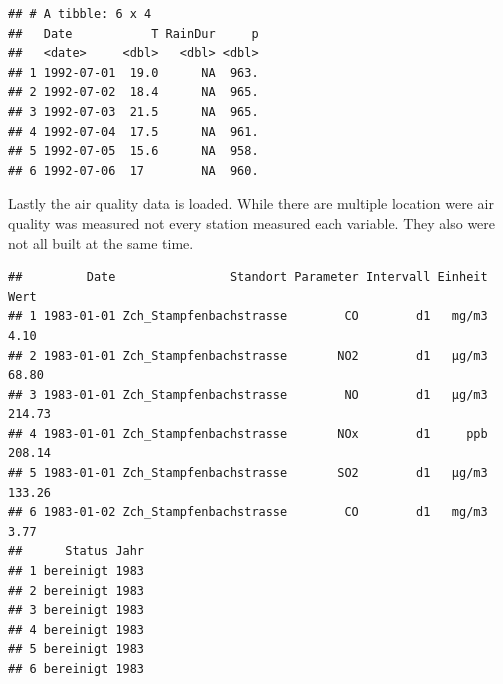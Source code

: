 \documentclass[
]{article}
\newenvironment{Shaded}{\begin{snugshade}}{\end{snugshade}}
\newcommand{\AttributeTok}[1]{\textcolor[rgb]{0.77,0.63,0.00}{#1}}
\newcommand{\CommentTok}[1]{\textcolor[rgb]{0.56,0.35,0.01}{\textit{#1}}}
\newcommand{\ConstantTok}[1]{\textcolor[rgb]{0.00,0.00,0.00}{#1}}
\newcommand{\DecValTok}[1]{\textcolor[rgb]{0.00,0.00,0.81}{#1}}
\newcommand{\FunctionTok}[1]{\textcolor[rgb]{0.00,0.00,0.00}{#1}}
\newcommand{\NormalTok}[1]{#1}
\newcommand{\OtherTok}[1]{\textcolor[rgb]{0.56,0.35,0.01}{#1}}
\newcommand{\SpecialCharTok}[1]{\textcolor[rgb]{0.00,0.00,0.00}{#1}}
\newcommand{\StringTok}[1]{\textcolor[rgb]{0.31,0.60,0.02}{#1}}
\begin{document}
\begin{verbatim}
## # A tibble: 6 x 4
##   Date           T RainDur     p
##   <date>     <dbl>   <dbl> <dbl>
## 1 1992-07-01  19.0      NA  963.
## 2 1992-07-02  18.4      NA  965.
## 3 1992-07-03  21.5      NA  965.
## 4 1992-07-04  17.5      NA  961.
## 5 1992-07-05  15.6      NA  958.
## 6 1992-07-06  17        NA  960.
\end{verbatim}

Lastly the air quality data is loaded. While there are multiple location
were air quality was measured not every station measured each variable.
They also were not all built at the same time.

\begin{Shaded}
\end{Shaded}

\begin{verbatim}
##         Date                Standort Parameter Intervall Einheit   Wert
## 1 1983-01-01 Zch_Stampfenbachstrasse        CO        d1   mg/m3   4.10
## 2 1983-01-01 Zch_Stampfenbachstrasse       NO2        d1   µg/m3  68.80
## 3 1983-01-01 Zch_Stampfenbachstrasse        NO        d1   µg/m3 214.73
## 4 1983-01-01 Zch_Stampfenbachstrasse       NOx        d1     ppb 208.14
## 5 1983-01-01 Zch_Stampfenbachstrasse       SO2        d1   µg/m3 133.26
## 6 1983-01-02 Zch_Stampfenbachstrasse        CO        d1   mg/m3   3.77
##      Status Jahr
## 1 bereinigt 1983
## 2 bereinigt 1983
## 3 bereinigt 1983
## 4 bereinigt 1983
## 5 bereinigt 1983
## 6 bereinigt 1983
\end{verbatim}
\end{document}
